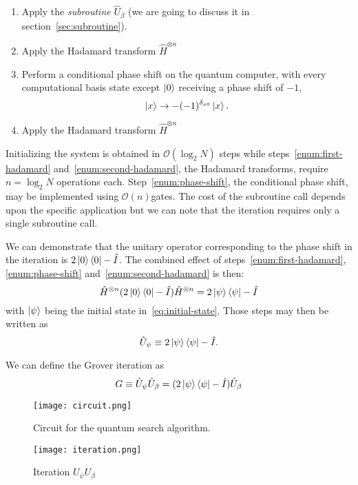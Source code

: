 \begin{enumerate}
  \item Apply the \emph{subroutine} $\hat{U}_\beta$ (we are going to discuss it in section~\ref{sec:subroutine}).
  \item Apply the Hadamard transform $\hat{H}^{\otimes n}$ \label{enum:first-hadamard}
  \item \label{enum:phase-shift} Perform a conditional phase shift on the quantum computer, with every computational basis state except $\ket{0}$ receiving a phase shift of $-1$,
  \begin{equation*}
      \ket{x} \rightarrow -(-1)^{\delta_{x0}} \ket{x}.
  \end{equation*}
  \item Apply the Hadamard transform $\hat{H}^{\otimes n}$ \label{enum:second-hadamard}
\end{enumerate}
Initializing the system is obtained in $\mathcal{O}(\log_2{N})$ steps while steps~\ref{enum:first-hadamard} and~\ref{enum:second-hadamard}, the Hadamard transforms, require $n=\log_2{N}$ operations each. Step~\ref{enum:phase-shift}, the conditional phase shift, may be implemented using $\mathcal{O}(n)$gates. The cost of the subroutine call depends upon the specific application but we can note that the iteration requires only a single subroutine call.


\begin{defn}
We can demonstrate that the unitary operator corresponding to the phase shift in the iteration is $2\ket{0}\bra{0}-\hat{I}$. The combined effect of steps~\ref{enum:first-hadamard},\ref{enum:phase-shift} and~\ref{enum:second-hadamard} is then:
\begin{equation*}
    \hat{H}^{\otimes n} (2\ket{0}\bra{0}-\hat{I}) \hat{H}^{\otimes n} =  2\ket{\psi}\bra{\psi}-\hat{I}
\end{equation*}
with $\ket{\psi}$ being the initial state in~\ref{eq:initial-state}. Those steps may then be written as
\begin{equation*}
    \hat{U}_\psi \equiv 2 \ket{\psi}\bra{\psi} - \hat{I}.
\end{equation*}
\end{defn}
\begin{defn}
We can define the Grover iteration as
\begin{equation}\label{def:grover-iteration}
G \equiv \hat{U}_\psi\hat{U}_\beta = (2 \ket{\psi}\bra{\psi} - \hat{I}) \hat{U}_\beta
\end{equation}
\end{defn}
\begin{figure}
\texttt{[image: circuit.png]}
\centering
\caption{Circuit for the quantum search algorithm.}
\end{figure}
\begin{figure}
\texttt{[image: iteration.png]}
\centering
\caption{Iteration $U_\psi U_\beta$}
\end{figure}

